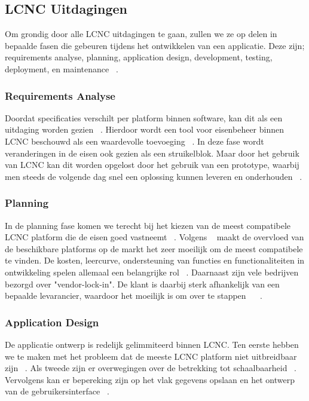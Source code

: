 \subsection*{LCNC Uitdagingen}
\label{sub:lcnc-uitdagingen}
Om grondig door alle LCNC uitdagingen te gaan, zullen we ze op delen in bepaalde fasen
die gebeuren tijdens het ontwikkelen van een applicatie. 
Deze zijn; requirements analyse, planning, application design, development, testing, deployment, en maintenance ~\autocite{Rokis_2022}.
\subsubsection*{Requirements Analyse}
\label{sub:requirements-analyse}
Doordat specificaties verschilt per platform binnen software, kan dit als een uitdaging worden gezien ~\autocite{Rokis_2022}.
Hierdoor wordt een tool voor eisenbeheer binnen LCNC beschouwd als een waardevolle toevoeging ~\autocite{Rokis_2022}. 
In deze fase wordt veranderingen in de eisen ook gezien als een struikelblok. Maar door het gebruik van LCNC kan dit worden opgelost 
door het gebruik van een prototype, waarbij men steeds de volgende dag snel een oplossing kunnen leveren en onderhouden ~\autocite{Rokis_2022}.
\subsubsection*{Planning}
\label{sub:planning}
In de planning fase komen we terecht bij het kiezen van de meest compatibele LCNC platform die de eisen goed vastneemt ~\autocite{Rokis_2022}.
Volgens ~\textcite{Rokis_2022} maakt de overvloed van de beschikbare platforms op de markt het zeer moeilijk om de meest compatibele te vinden. De 
kosten, leercurve, ondersteuning van functies en functionaliteiten in ontwikkeling spelen allemaal een belangrijke rol ~\autocite{Rokis_2022}. Daarnaast zijn vele
bedrijven bezorgd over "vendor-lock-in". De klant is daarbij sterk afhankelijk van een bepaalde levarancier, waardoor het moeilijk is om over te stappen ~\autocite{Rokis_2022} ~\autocite{Yan2021}.
\subsubsection*{Application Design}
\label{sub:application-design}
De applicatie ontwerp is redelijk gelimmiteerd binnen LCNC.
Ten eerste hebben we te maken met het probleem dat de meeste LCNC platform niet uitbreidbaar zijn ~\autocite{Rokis_2022}.
Als tweede zijn er overwegingen over de betrekking tot schaalbaarheid ~\autocite{Rokis_2022}. 
Vervolgens kan er bepereking zijn op het vlak gegevens opslaan en het ontwerp van de gebruikersinterface ~\autocite{Rokis_2022}.
